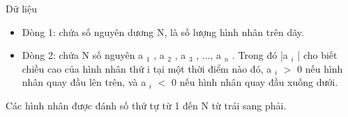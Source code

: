 Dữ liệu
\begin{itemize}
	\item     Dòng 1: chứa số nguyên dương N, là số lượng hình nhân trên dãy.   
	\item     Dòng 2: chứa N số nguyên a    $_     1    $    , a    $_     2    $    , a    $_     3    $    , ..., a    $_     n    $    . Trong đó |a    $_     i    $    | cho biết chiều cao của hình nhân thứ i tại một thời điểm nào đó, a    $_     i    $    $>$ 0 nếu hình nhân quay đầu lên trên, và a    $_     i    $    $<$ 0 nếu hình nhân quay đầu xuống dưới.   
\end{itemize}

   Các hình nhân được đánh số thứ tự từ 1 đến N từ trái sang phải.